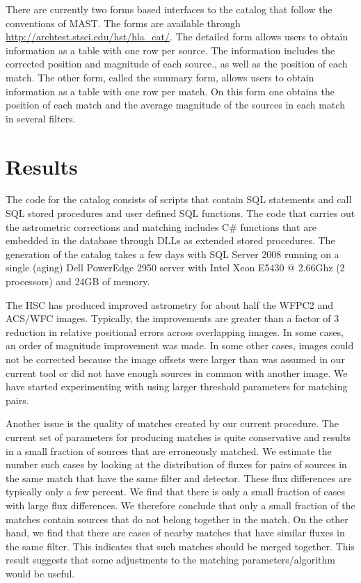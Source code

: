 \documentclass[11pt,twoside]{article}
\begin{document}
There are currently two forms based interfaces to the catalog that follow
the conventions of MAST. The forms are available through \url{http://archtest.stsci.edu/hst/hla_cat/}.
The detailed form allows users to obtain information as a table with one row per source.
The information includes the corrected position and magnitude of each source., as well as the position
of each match.
The other form, called the summary form, allows users to obtain information as a table with one row per match.
On this form one obtains the position of each match and the average magnitude of the sources
in each match in several filters.

\section{Results}


The code for the catalog consists  of scripts that contain SQL statements
and call SQL stored procedures and user defined SQL functions.
The code that carries out the astrometric corrections and matching includes  C\# functions that are
embedded in the database through DLLs as extended stored procedures. The generation of the catalog
takes a few days  with SQL Server 2008 running on a single (aging) Dell PowerEdge 2950 server with 
Intel Xeon E5430 @ 2.66Ghz (2 processors) and 24GB of memory.

The HSC has produced improved astrometry for about half the WFPC2 and ACS/WFC
images. 
Typically, the improvements are greater than a factor of 3 reduction in relative positional errors across overlapping
images.
In some cases, an order of magnitude improvement was made.
In some other cases, images could not be corrected because
the image offsets were larger than was assumed in our current tool or did not have enough sources in common 
with another image. We have started experimenting
with using larger threshold parameters for matching pairs.

Another issue is the quality of matches created by our current procedure.
The current set of parameters for producing matches is quite conservative
and results in a small fraction of sources that are erroneously matched. We estimate the number
such cases by looking at the distribution of fluxes for pairs of sources in the same
match that have the same filter and detector. These flux differences are typically only a few
percent. We find that there is only a small
fraction of cases with large flux differences.  We therefore conclude that only a small fraction
of the matches contain sources that do not belong together in the match. On
the other hand, we find that there are cases of nearby matches that have similar
fluxes in the same filter. This indicates that such matches should be merged together.
This result suggests that some adjustments to the matching parameters/algorithm would be useful.
\end{document}
